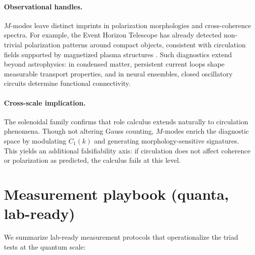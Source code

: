 \documentclass[12pt,a4paper,oneside]{scrreprt}
\begin{document}
\paragraph{Observational handles.} 
$M$-modes leave distinct imprints in polarization morphologies and 
cross-coherence spectra. 
For example, the Event Horizon Telescope has already detected 
non-trivial polarization patterns around compact objects, 
consistent with circulation fields supported by magnetized plasma structures 
\citep{EventHorizonTelescope2021Polarization}. 
Such diagnostics extend beyond astrophysics: in condensed matter, 
persistent current loops shape measurable transport properties, 
and in neural ensembles, closed oscillatory circuits determine 
functional connectivity. 

\paragraph{Cross-scale implication.} 
The solenoidal family confirms that role calculus extends naturally 
to circulation phenomena. 
Though not altering Gauss counting, $M$-modes enrich the diagnostic space 
by modulating $C_1(k)$ and generating morphology-sensitive signatures. 
This yields an additional falsifiability axis: if circulation does not 
affect coherence or polarization as predicted, the calculus fails at this level.

\section{Measurement playbook (quanta, lab-ready)}\label{sec:quanta-playbook}

We summarize lab-ready measurement protocols that operationalize the triad tests 
at the quantum scale:
\end{document}
